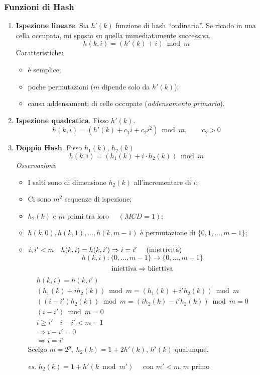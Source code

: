 \subsubsection{Funzioni di Hash}
\begin{enumerate}
    \item \textbf{Ispezione lineare}. Sia $h'(k)$ funzione di hash ``ordinaria''. Se 
        ricado in una cella occupata, mi sposto su quella immediatamente successiva.
        $$h(k,i) = (h'(k)+i) \bmod m$$
        Caratteristiche:
        \begin{itemize}
            \item è semplice;
            \item poche permutazioni ($m$ dipende solo da $h'(k)$);
            \item causa addensamenti di celle occupate (\emph{addensamento primario}).
        \end{itemize}
    \item \textbf{Ispezione quadratica}. Fisso $h'(k)$.
    $$h(k,i) = (h'(k) + c_1i + c_2i^2) \bmod m, \qquad c_2 > 0$$

    \item \textbf{Doppio Hash}. Fisso $h_1(k)$, $h_2(k)$
    $$h(k,i) = (h_1(k) + i \cdot h_2(k)) \bmod m$$
    \emph{Osservazioni}:
    \begin{itemize}
        \item I salti sono di dimensione $h_2(k)$ all'incrementare di $i$; 
        \item Ci sono $m^2$ sequenze di ispezione;
        \item $h_2(k)$ e $m$ primi tra loro $ \quad (MCD = 1)$;
        \item $h(k,0),h(k,1),\dots,h(k,m-1)$ è permutazione di $\{0,1,\dots,m-1\}$;
        \item $i, i'<m \quad h(k,i) = h(k,i') \Rightarrow i = i' \ \quad (\text{\emph{iniettività}})$
        $$h(k,i) \colon \{0,\dots,m-1\} \to \{0,\dots,m-1\}$$
        $$\text{\emph{iniettiva}} \Rightarrow \text{\emph{biiettiva}}$$
        \begin{gather*}
            h(k,i) = h(k,i') \\
            (h_1(k) + ih_2(k)) \bmod m = (h_1(k) + i'h_2(k)) \bmod m \\
            ((i - i')h_2(k)) \bmod m = (i h_2(k) - i'h_2(k)) \bmod m = 0 \\
            (i - i') \bmod m = 0 \\
            i \geq i' \quad i - i' < m - 1 \\ 
            \Rightarrow i - i' = 0 \\
            \Rightarrow i = i'
        \end{gather*}
        Scelgo $m = 2^p, \ h_2(k) = 1 + 2h'(k)$, $h'(k)$ qualunque.\par
        \emph{es.} $h_2(k) = 1 + h'(k \bmod m') \quad$ con $m' < m, m$ primo
    \end{itemize}
    \end{enumerate}

